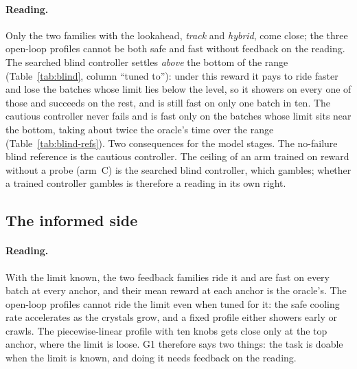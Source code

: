 \documentclass[11pt,a4paper]{article}
\begin{document}
\begin{table}[h]
\centering\small
\resizebox{\linewidth}{!}{}
\caption{The two blind references on the same fresh batches, by third of the
limit's range: the cautious controller, which rides at the bottom of the
range and is safe on every batch, and the searched blind controller, which
maximises the reward.}
\label{tab:blind-refs}
\end{table}

\paragraph{Reading.} Only the two families with the lookahead, \emph{track}
and \emph{hybrid}, come close; the three open-loop profiles cannot be both
safe and fast without feedback on the reading. The searched blind controller
settles \emph{above} the bottom of the range (Table~\ref{tab:blind}, column
``tuned to''): under this reward it pays to ride faster and lose the batches
whose limit lies below the level, so it showers on every one of those and
succeeds on the rest, and is still fast on only one batch in ten. The cautious
controller never fails and is fast only on the batches whose limit sits near
the bottom, taking about twice the oracle's time over the range
(Table~\ref{tab:blind-refs}). Two consequences for the model stages. The
no-failure blind reference is the cautious controller. The ceiling of an arm
trained on reward without a probe (arm~C) is the searched blind controller,
which gambles; whether a trained controller gambles is therefore a reading in
its own right.

\subsection{The informed side}

\begin{table}[h]
\centering\small

\caption{Informed side: one controller per family per anchor, tuned at that
limit, scored on the fresh batches at that limit.}
\label{tab:informed}
\end{table}

\paragraph{Reading.} With the limit known, the two feedback families ride it
and are fast on every batch at every anchor, and their mean reward at each
anchor is the oracle's. The open-loop profiles cannot ride the limit even when
tuned for it: the safe cooling rate accelerates as the crystals grow, and a
fixed profile either showers early or crawls. The piecewise-linear profile
with ten knobs gets close only at the top anchor, where the limit is loose.
G1 therefore says two things: the task is doable when the limit is known, and
doing it needs feedback on the reading.
\end{document}
